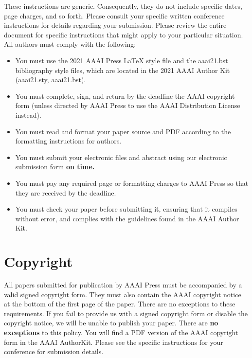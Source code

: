 \documentclass[letterpaper]{article} %
\begin{document}
These instructions are generic. Consequently, they do not include specific dates, page charges, and so forth. Please consult your specific written conference instructions for details regarding your submission. Please review the entire document for specific instructions that might apply to your particular situation. All authors must comply with the following:

\begin{itemize}
\item You must use the 2021 AAAI Press \LaTeX{} style file and the aaai21.bst bibliography style files, which are located in the 2021 AAAI Author Kit (aaai21.sty, aaai21.bst).
\item You must complete, sign, and return by the deadline the AAAI copyright form (unless directed by AAAI Press to use the AAAI Distribution License instead).
\item You must read and format your paper source and PDF according to the formatting instructions for authors.
\item You must submit your electronic files and abstract using our electronic submission form \textbf{on time.}
\item You must pay any required page or formatting charges to AAAI Press so that they are received by the deadline.
\item You must check your paper before submitting it, ensuring that it compiles without error, and complies with the guidelines found in the AAAI Author Kit.
\end{itemize}

\section{Copyright}
All papers submitted for publication by AAAI Press must be accompanied by a valid signed copyright form. They must also contain the AAAI copyright notice at the bottom of the first page of the paper. There are no exceptions to these requirements. If you fail to provide us with a signed copyright form or disable the copyright notice, we will be unable to publish your paper. There are \textbf{no exceptions} to this policy. You will find a PDF version of the AAAI copyright form in the AAAI AuthorKit. Please see the specific instructions for your conference for submission details.
\end{document}
